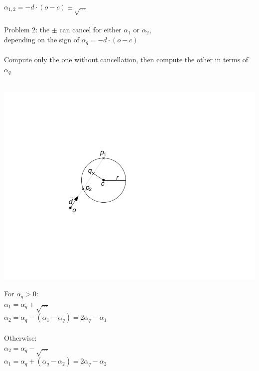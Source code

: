 \documentclass[utf8,stillsansserifmath,fleqn,t]{beamer}
\begin{document}
\begin{frame}
\frametitle{\insertsection}
$\alpha_{1,2} = -d\cdot(o-c) \pm \sqrt{\ldots}$\\~\\
Problem 2: the $\pm$ can cancel for either $\alpha_1$ or $\alpha_2$,\\
depending on the sign of $\alpha_q=-d\cdot(o-c)$\\~\\
Compute only the one without cancellation, then compute the other in terms of $\alpha_q$\\~\\
\begin{minipage}{.24\textwidth}
\includegraphics[width=\textwidth]{./fig/sphere-2.pdf}
\end{minipage}\hfill
\begin{minipage}{.64\textwidth}
For $\alpha_q>0$:\\
$\alpha_1 = \alpha_q + \sqrt{\ldots}$\\
$\alpha_2 = \alpha_q - (\alpha_1 - \alpha_q) = 2\alpha_q - \alpha_1$\\~\\
Otherwise:\\
$\alpha_2 = \alpha_q - \sqrt{\ldots}$\\
$\alpha_1 = \alpha_q + (\alpha_q - \alpha_2) = 2\alpha_q - \alpha_2$\\
\end{minipage}\\
\end{frame}
\end{document}
